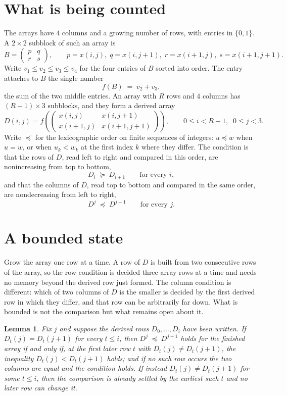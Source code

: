 \documentclass[11pt,a4paper]{article}
\theoremstyle{plain}
\newtheorem{lemma}[theorem]{Lemma}
\theoremstyle{definition}
\begin{document}
\section{What is being counted}

The arrays have $4$ columns and a growing number of rows, with entries in $\{0,1\}$. A
$2\times2$ subblock of such an array is
\[
B=\begin{pmatrix} p & q \\ r & s \end{pmatrix},
\qquad p=x(i,j),\; q=x(i,j+1),\; r=x(i+1,j),\; s=x(i+1,j+1).
\]
Write $v_1\le v_2\le v_3\le v_4$ for the four entries of $B$ sorted into order. The entry attaches to $B$ the single number
\[
f(B)\;=\;v_2+v_3,
\]
the sum of the two middle entries. An array with $R$ rows and $4$ columns has $(R-1)\times3$ subblocks, and they
form a derived array
\[
D(i,j)=f\!\left(\begin{pmatrix} x(i,j) & x(i,j+1) \\ x(i+1,j) & x(i+1,j+1)\end{pmatrix}
\right),\qquad 0\le i<R-1,\;\; 0\le j<3 .
\]
Write $\preceq$ for the lexicographic order on finite sequences of integers: $u\preceq w$ when
$u=w$, or when $u_k<w_k$ at the first index $k$ where they differ. The condition is that the
rows of $D$, read left to right and compared in this order, are nonincreasing from top to bottom,
\[
D_{i}\;\succeq\;D_{i+1}\qquad\text{for every } i,
\]
and that the columns of $D$, read top to bottom and compared in the same order, are nondecreasing
from left to right,
\[
D^{j}\;\preceq\;D^{j+1}\qquad\text{for every } j .
\]

\section{A bounded state}

Grow the array one row at a time. A row of $D$ is built from two consecutive rows of the array,
so the row condition is decided three array rows at a time and needs no memory beyond the
derived row just formed. The column condition is different: which of two columns of $D$ is the
smaller is decided by the first derived row in which they differ, and that row can be
arbitrarily far down. What is bounded is not the comparison but what remains open about it.

\begin{lemma}\label{lem:bits}
Fix $j$ and suppose the derived rows $D_0,\dots,D_i$ have been written. If $D_t(j)=D_t(j+1)$ for
every $t\le i$, then $D^{j}\;\preceq\;D^{j+1}$ holds for the finished array if and only if,
at the first later row $t$ with $D_t(j)\neq D_t(j+1)$, the inequality $D_t(j)<D_t(j+1)$
holds; and if no such row occurs the two columns are equal and the condition holds. If instead
$D_t(j)\neq D_t(j+1)$ for some $t\le i$, then the comparison is already settled by the earliest
such $t$ and no later row can change it.
\end{lemma}
\end{document}
